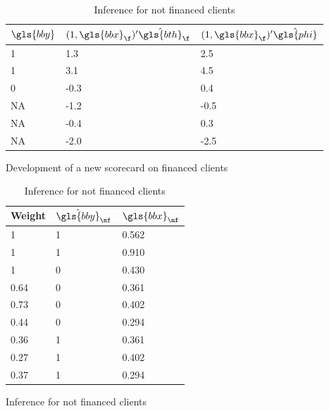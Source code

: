 \begin{table}
{\begin{multicols}{4}
\columnbreak

\begin{subfigure}[t]{0.22\textwidth}
\begin{center}
\begin{adjustbox}{max width=0.95\textwidth}
\begin{tabular}{l l l}
\toprule
\textbf{${\gls{bby}}$} & \textbf{$(1,\gls{bbx}_\f)' \hat{\gls{bth}}_\f$} & \textbf{$(1,\gls{bbx}_\f)' \hat{\gls{phi}}$}\\
\midrule
1 & 1.3 & 2.5\\
1 & 3.1 & 4.5 \\
0 & -0.3 & 0.4 \\
NA & -1.2 & -0.5 \\
NA & -0.4 & 0.3 \\
NA & -2.0 & -2.5 \\
\bottomrule
\end{tabular}
\end{adjustbox}
\end{center}

\caption{Development of a new scorecard on financed clients}
\label{twins:sfig3}
\end{subfigure}

\columnbreak

\begin{subfigure}[t]{0.22\textwidth}
\begin{center}
\begin{adjustbox}{max width=0.95\textwidth}
\begin{tabular}{l l l}
\toprule
\textbf{Weight} & \textbf{$\hat{\gls{bby}}_{\nf}$} & \textbf{${\gls{bbx}}_{\nf}$}\\
\midrule
1 & 1 & 0.562 \\
1 & 1 & 0.910 \\
1 & 0 & 0.430 \\
0.64 & 0 & 0.361 \\
0.73 & 0 & 0.402 \\
0.44 & 0 & 0.294 \\
0.36 & 1 & 0.361 \\
0.27 & 1 & 0.402 \\
0.37 & 1 & 0.294 \\
\bottomrule
\end{tabular}
\end{adjustbox}
\end{center}

\caption{Inference for not financed clients}
\label{twins:sfig4}
\end{subfigure}

\end{multicols}
}
\end{table}

